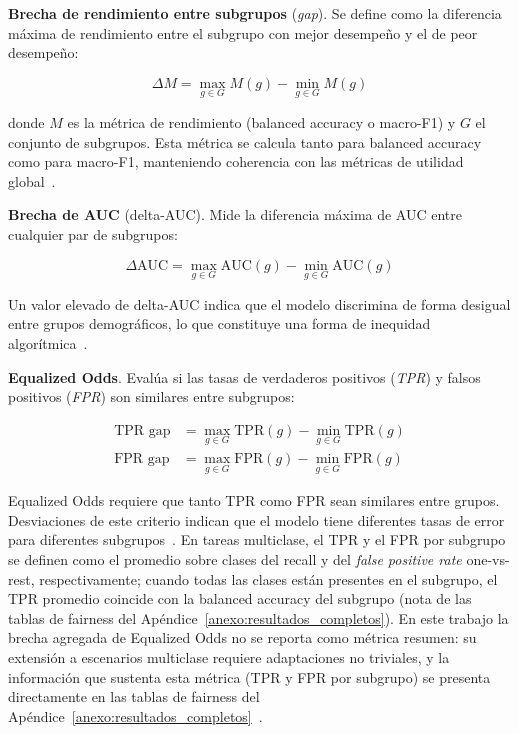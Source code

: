 \textbf{Brecha de rendimiento entre subgrupos} (\textit{gap}). Se define como la diferencia máxima de rendimiento entre el subgrupo con mejor desempeño y el de peor desempeño:

\begin{equation}
    \Delta M = \max_{g \in G} M(g) - \min_{g \in G} M(g)
    \label{eq:gap}
\end{equation}

donde $M$ es la métrica de rendimiento (balanced accuracy o macro-F1) y $G$ el conjunto de subgrupos. Esta métrica se calcula tanto para balanced accuracy como para macro-F1, manteniendo coherencia con las métricas de utilidad global~\parencite{huang2025flex}.

\textbf{Brecha de AUC} (delta-AUC). Mide la diferencia máxima de AUC entre cualquier par de subgrupos:

\begin{equation}
    \Delta\text{AUC} = \max_{g \in G} \text{AUC}(g) - \min_{g \in G} \text{AUC}(g)
    \label{eq:delta_auc}
\end{equation}

Un valor elevado de delta-AUC indica que el modelo discrimina de forma desigual entre grupos demográficos, lo que constituye una forma de inequidad algorítmica~\parencite{obermeyer2019dissecting}.

\textbf{Equalized Odds}. Evalúa si las tasas de verdaderos positivos (\textit{TPR}) y falsos positivos (\textit{FPR}) son similares entre subgrupos:

\begin{align}
    \text{TPR gap} &= \max_{g \in G} \text{TPR}(g) - \min_{g \in G} \text{TPR}(g) \label{eq:tpr_gap} \\
    \text{FPR gap} &= \max_{g \in G} \text{FPR}(g) - \min_{g \in G} \text{FPR}(g) \label{eq:fpr_gap}
\end{align}

Equalized Odds requiere que tanto TPR como FPR sean similares entre grupos. Desviaciones de este criterio indican que el modelo tiene diferentes tasas de error para diferentes subgrupos~\parencite{chen2023algorithmic}. En tareas multiclase, el TPR y el FPR por subgrupo se definen como el promedio sobre clases del recall y del \textit{false positive rate} one-vs-rest, respectivamente; cuando todas las clases están presentes en el subgrupo, el TPR promedio coincide con la balanced accuracy del subgrupo (nota de las tablas de fairness del Apéndice~\ref{anexo:resultados_completos}). En este trabajo la brecha agregada de Equalized Odds no se reporta como métrica resumen: su extensión a escenarios multiclase requiere adaptaciones no triviales, y la información que sustenta esta métrica (TPR y FPR por subgrupo) se presenta directamente en las tablas de fairness del Apéndice~\ref{anexo:resultados_completos}~\parencite{matos2025critical}.

